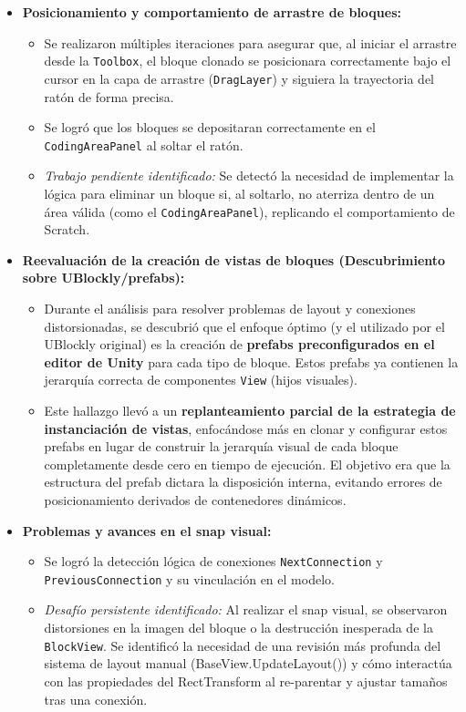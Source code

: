 \begin{itemize}
\begin{itemize}
\begin{itemize}
		\end{itemize}
		\item \textbf{Posicionamiento y comportamiento de arrastre de bloques:}
		\begin{itemize}
			\item Se realizaron múltiples iteraciones para asegurar que, al iniciar el arrastre desde la \texttt{Toolbox}, el bloque clonado se posicionara correctamente bajo el cursor en la capa de arrastre (\texttt{DragLayer}) y siguiera la trayectoria del ratón de forma precisa.
			\item Se logró que los bloques se depositaran correctamente en el \texttt{CodingAreaPanel} al soltar el ratón.
			\item \textit{Trabajo pendiente identificado:} Se detectó la necesidad de implementar la lógica para eliminar un bloque si, al soltarlo, no aterriza dentro de un área válida (como el \texttt{CodingAreaPanel}), replicando el comportamiento de Scratch.
		\end{itemize}
		\item \textbf{Reevaluación de la creación de vistas de bloques (Descubrimiento sobre UBlockly/prefabs):}
		\begin{itemize}
			\item Durante el análisis para resolver problemas de layout y conexiones distorsionadas, se descubrió que el enfoque óptimo (y el utilizado por el UBlockly original) es la creación de \textbf{prefabs preconfigurados en el editor de Unity} para cada tipo de bloque. Estos prefabs ya contienen la jerarquía correcta de componentes \texttt{View} (hijos visuales).
			\item Este hallazgo llevó a un \textbf{replanteamiento parcial de la estrategia de instanciación de vistas}, enfocándose más en clonar y configurar estos prefabs en lugar de construir la jerarquía visual de cada bloque completamente desde cero en tiempo de ejecución. El objetivo era que la estructura del prefab dictara la disposición interna, evitando errores de posicionamiento derivados de contenedores dinámicos.
		\end{itemize}
		\item \textbf{Problemas y avances en el snap visual:}
		\begin{itemize}
			\item Se logró la detección lógica de conexiones \texttt{NextConnection} y \texttt{PreviousConnection} y su vinculación en el modelo.
			\item \textit{Desafío persistente identificado:} Al realizar el snap visual, se observaron distorsiones en la imagen del bloque o la destrucción inesperada de la \texttt{BlockView}. Se identificó la necesidad de una revisión más profunda del sistema de layout manual (BaseView.UpdateLayout()) y cómo interactúa con las propiedades del RectTransform al re-parentar y ajustar tamaños tras una conexión.

\end{itemize}
\end{itemize}
\end{itemize}
